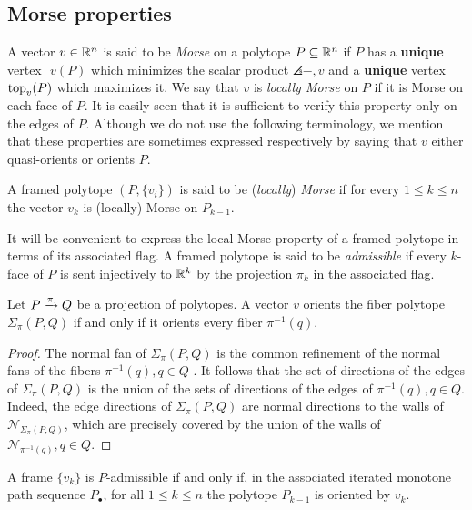 
\subsection{Morse properties} 

A vector $v \in \mathbb{R}^n$ is said to be \textit{Morse} on a polytope $P \subseteq \mathbb{R}^n$ if $P$ has a \textbf{unique} vertex $\bm_v(P)$ which minimizes the scalar product $\angles{-,v}$ and a \textbf{unique} vertex $\operatorname{top}_v(P)$ which maximizes it.
We say that $v$ is \textit{locally Morse} on $P$ if it is Morse on each face of $P$.
It is easily seen that it is sufficient to verify this property only on the edges of $P$.
Although we do not use the following terminology, we mention that these properties are sometimes expressed respectively by saying that $v$ either quasi-orients or orients $P$.

A framed polytope $(P, \{v_i\})$ is said to be (\textit{locally}) \textit{Morse} if for every $1 \leq k \leq n$ the vector $v_k$ is (locally) Morse on $P_{k-1}$.

It will be convenient to express the local Morse property of a framed polytope in terms of its associated flag.
A framed polytope is said to be \emph{admissible} if every $k$-face of $P$ is sent injectively to $\mathbb{R}^k$ by the projection $\pi_k$ in the associated flag.

\begin{lemma} \label{l:orients-the-fibers}
	Let $P \xrightarrow{\pi} Q$ be a projection of polytopes.
	A vector $v$ orients the fiber polytope $\Sigma_\pi(P, Q)$ if and only if it orients every fiber $\pi^{-1}(q)$.
\end{lemma}

\begin{proof}
	The normal fan of $\Sigma_\pi(P,Q)$ is the common refinement of the normal fans of the fibers $\pi^{-1}(q), q \in Q$ \cite[Proposition 2.2]{BilleraSturmfels94}.
	It follows that the set of directions of the edges of $\Sigma_\pi(P,Q)$ is the union of the sets of directions of the edges of $\pi^{-1}(q), q \in Q$.
	Indeed, the edge directions of $\Sigma_\pi(P,Q)$ are normal directions to the walls of $\mathcal{N}_{\Sigma_\pi(P,Q)}$, which are precisely covered by the union of the walls of $\mathcal{N}_{\pi^{-1}(q)}, q \in Q$.
\end{proof}

\begin{lemma} \label{l:KV-BS}
	A frame $\{v_k\}$ is $P$-admissible if and only if, in the associated iterated monotone path sequence $P_\bullet$, for all $1 \leq k \leq n$ the polytope $P_{k-1}$ is oriented by $v_k$.
\end{lemma}

